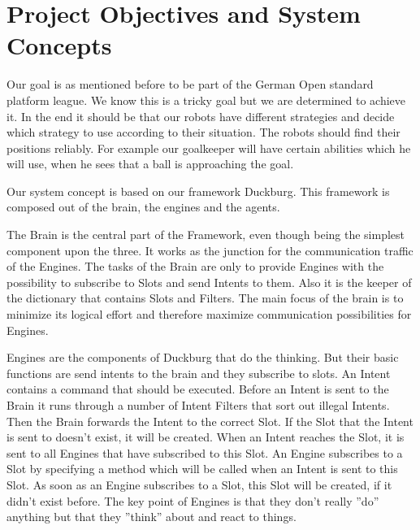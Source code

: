 \documentclass[12pt]{article}
\theoremstyle{definition}
\begin{document}
\pagebreak

\section{Project Objectives and System Concepts}

Our goal is as mentioned before to be part of the German Open standard platform league. We know this is a tricky goal but we are determined to achieve it. In the end it should be that our robots have different strategies and decide which strategy to use according to their situation. The robots should find their positions reliably. For example our goalkeeper will have certain abilities which he will use, when he sees that a ball is approaching the goal. 
\newline

Our system concept is based on our framework Duckburg. This framework is composed out of the brain, the engines and the agents.
\newline

The Brain is the central part of the Framework, even though being the simplest component upon the three. It works as the junction for the communication traffic of the Engines. The tasks of the Brain are only to provide Engines with the possibility to subscribe to Slots and send Intents to them. Also it is the keeper of the dictionary that contains Slots and Filters. The main focus of the brain is to minimize its logical effort and therefore maximize communication possibilities for Engines.\linebreak

Engines are the components of Duckburg that do the thinking. But their basic functions are send intents to the brain and they subscribe to slots.  An Intent contains a command that should be executed. Before an Intent is sent to the Brain it runs through a number of Intent Filters that sort out illegal Intents. Then the Brain forwards the Intent to the correct Slot. If the Slot that the Intent is sent to doesn’t exist, it will be created. When an Intent reaches the Slot, it is sent to all Engines that have subscribed to this Slot. An Engine subscribes to a Slot by specifying a method which will be called when an Intent is sent to this Slot. As soon as an Engine subscribes to a Slot, this Slot will be created, if it didn’t exist before. The key point of Engines is that they don’t really ”do” anything but that they ”think” about and react to things.\linebreak
\end{document}
